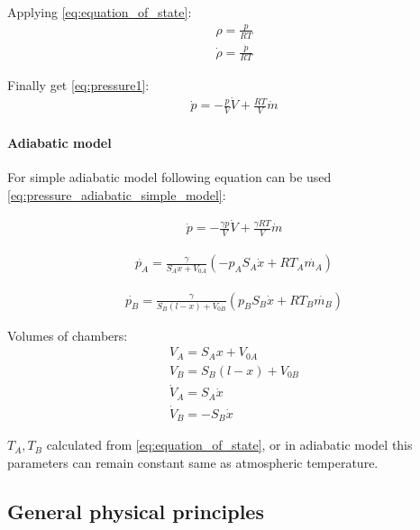 \documentclass[class=article, crop=false]{standalone}
\begin{document}
Applying \ref{eq:equation_of_state}:
\begin{align}
    \rho = \frac{p}{RT} \\
    \dot{\rho} = \frac{\dot{p}}{RT} 
\end{align}

Finally get \ref{eq:pressure1}:
\begin{align}
    \dot{p} = - \frac{p}{V}\dot{V} + \frac{RT}{V}\dot{m}
    \label{eq:pressure1}
\end{align}

\paragraph{Adiabatic model} 
For simple adiabatic model following equation can be used
\ref{eq:pressure_adiabatic_simple_model}:

\begin{align}
    \dot{p} = - \frac{\gamma p}{V}\dot{V} + \frac{\gamma RT}{V}\dot{m}
    \label{eq:pressure_adiabatic_simple_model}
\end{align}

\begin{align}
    \dot{p_A} = \frac{\gamma}{S_A x + V_{0A}} \left(- p_A S_A\dot{x} + RT_A\dot{m_A}
    \right)
\end{align}

\begin{align}
    \dot{p_B} = \frac{\gamma}{S_B (l-x) + V_{0B}} \left(p_B S_B\dot{x} + RT_B\dot{m_B}
    \right)
\end{align}

Volumes of chambers:
\begin{align}
    V_A = S_A x + V_{0A} \\
    V_B = S_B (l-x) + V_{0B} \\
    \dot{V}_A = S_A \dot{x} \\
    \dot{V}_B = - S_B \dot{x}
\end{align}

$T_A, T_B$ calculated from \ref{eq:equation_of_state}, or in adiabatic
model this parameters can remain constant same as atmospheric temperature.




\subsection{General physical principles}
\end{document}
